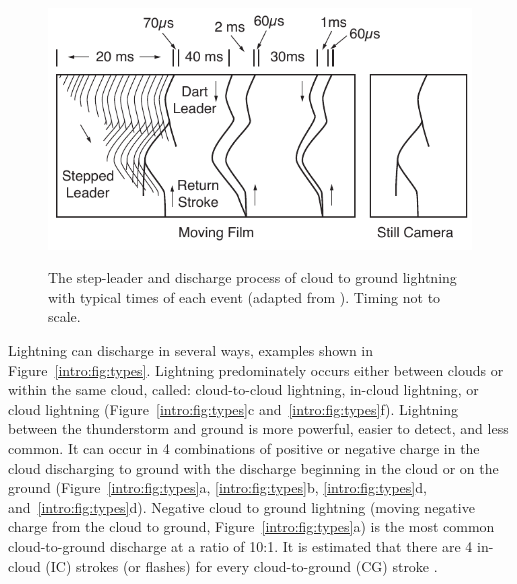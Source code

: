 \begin{figure}[ht!]
	\centering
	\includegraphics[scale=1]{Introduction/Figures/Lightning_Evolution.pdf}\\
	\caption{The step-leader and discharge process of cloud to ground lightning with typical times of each event (adapted from \citet{Uman1969}). Timing not to scale.}
	\label{intro:fig:evolution}
\end{figure}

Lightning can discharge in several ways, examples shown in Figure~\ref{intro:fig:types}.
Lightning predominately occurs either between clouds or within the same cloud, called: cloud-to-cloud lightning, in-cloud lightning, or cloud lightning (Figure~\ref{intro:fig:types}c and~\ref{intro:fig:types}f).
Lightning between the thunderstorm and ground is more powerful, easier to detect, and less common.
It can occur in 4 combinations of positive or negative charge in the cloud discharging to ground with the discharge beginning in the cloud or on the ground (Figure~\ref{intro:fig:types}a, \ref{intro:fig:types}b, \ref{intro:fig:types}d, and~\ref{intro:fig:types}d).
Negative cloud to ground lightning (moving negative charge from the cloud to ground, Figure~\ref{intro:fig:types}a) is the most common cloud-to-ground discharge at a ratio of 10:1.
It is estimated that there are 4 in-cloud (IC) strokes (or flashes) for every cloud-to-ground (CG) stroke \citep{Uman1969}.

